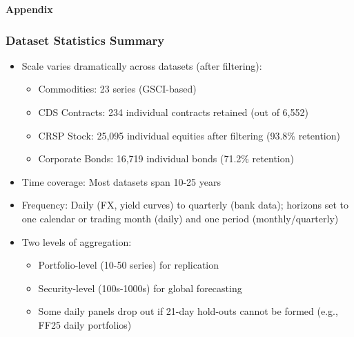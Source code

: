 \documentclass[ignorenonframetext, 9pt]{beamer}
\begin{document}
\appendix
\begin{frame}
  \centering
  \textbf{Appendix}
\end{frame}

\begin{frame}
  \frametitle{Dataset Statistics Summary}
  \label{slide:dataset_stats}
\small
\begin{itemize}
\item \alert{Scale varies dramatically across datasets (after filtering):}
\begin{itemize}
  \item Commodities: 23 series (GSCI-based)
  \item CDS Contracts: 234 individual contracts retained (out of 6,552)
  \item CRSP Stock: 25,095 individual equities after filtering (93.8\% retention)
  \item Corporate Bonds: 16,719 individual bonds (71.2\% retention)
\end{itemize}
\vspace{0.3cm}
\item \alert{Time coverage:} Most datasets span 10-25 years
\vspace{0.3cm}
\item \alert{Frequency:} Daily (FX, yield curves) to quarterly (bank data); horizons set to one calendar or trading month (daily) and one period (monthly/quarterly)
\vspace{0.3cm}
\item \alert{Two levels of aggregation:}
\begin{itemize}
  \item Portfolio-level (10-50 series) for replication
  \item Security-level (100s-1000s) for global forecasting
  \item Some daily panels drop out if 21-day hold-outs cannot be formed (e.g., FF25 daily portfolios)
\end{itemize}
\end{itemize}
\end{frame}
\end{document}
